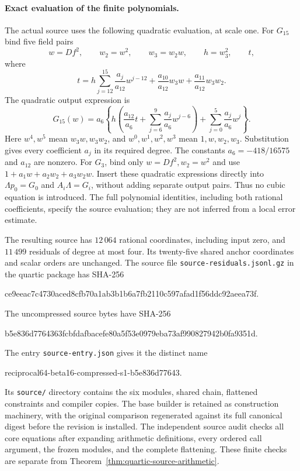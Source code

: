 \documentclass[11pt]{article}
\theoremstyle{definition}
\theoremstyle{remark}
\begin{document}
\paragraph{Exact evaluation of the finite polynomials.}
The actual source uses the following quadratic evaluation, at scale one.
For $G_{15}$ bind five field pairs
\[
 w=Df^2,\qquad w_2=w^2,\qquad w_3=w_2w,\qquad h=w_3^2,\qquad t,
\]
where
\[
 t=h\sum_{j=12}^{15}\frac{a_j}{a_{12}}w^{j-12}
       +\frac{a_{10}}{a_{12}}w_3w+\frac{a_{11}}{a_{12}}w_3w_2.
\]
The quadratic output expression is
\[
 G_{15}(w)=a_6\left\{
 h\left(\frac{a_{12}}{a_6}t+\sum_{j=6}^{9}\frac{a_j}{a_6}w^{j-6}\right)
       +\sum_{j=0}^{5}\frac{a_j}{a_6}w^j\right\}.
\]
Here $w^4,w^5$ mean $w_3w,w_3w_2$, and $w^0,w^1,w^2,w^3$ mean
$1,w,w_2,w_3$. Substitution gives every coefficient $a_j$ in its required
degree. The constants $a_6=-418/16575$ and $a_{12}$ are nonzero.
For $G_3$, bind only $w=Df^2,w_2=w^2$ and use
$1+a_1w+a_2w_2+a_3w_2w$. Insert these quadratic expressions directly
into $\Lambda p_0=G_0$ and $A_i\Lambda=G_i$, without adding separate
output pairs. Thus no cubic equation is introduced. The full polynomial
identities, including both rational coefficients, specify the source
evaluation; they are not inferred from a local error estimate.

The resulting source has $12\,064$ rational coordinates, including input
zero, and $11\,499$ residuals of degree at most four. Its twenty-five
shared anchor coordinates and scalar orders are unchanged. The source
file \nolinkurl{source-residuals.jsonl.gz} in the quartic package has SHA-256
\begin{center}\footnotesize\ttfamily
ce9eeac7c4730aced8cfb70a1ab3b1b6a7fb2110c597afad1f56ddc92aeea73f.
\end{center}
The uncompressed source bytes have SHA-256
\begin{center}\footnotesize\ttfamily
b5e836d7764363fcbfdafbacefe80a5f53e0979eba73af990827942b0fa9351d.
\end{center}
The entry \nolinkurl{source-entry.json} gives it the distinct name
\begin{center}\footnotesize\ttfamily
reciprocal64-beta16-compressed-s1-b5e836d77643.
\end{center}
Its \nolinkurl{source/} directory contains the six modules, shared chain,
flattened constraints and compiler copies. The base builder is retained
as construction machinery, with the original comparison regenerated
against its full canonical digest before the revision is installed.
The independent source audit checks all core equations after expanding
arithmetic definitions, every ordered call argument, the frozen modules,
and the complete flattening. These finite checks are separate from
Theorem~\ref{thm:quartic-source-arithmetic}.
\end{document}
